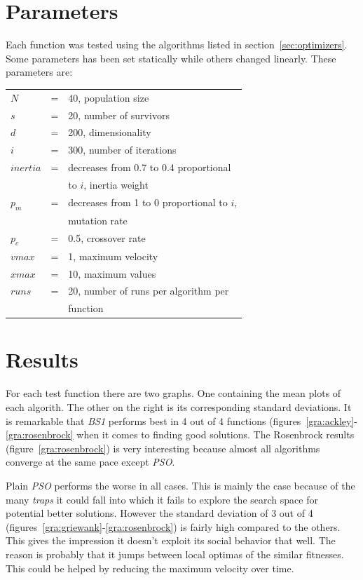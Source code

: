 \documentclass{acm_proc_article-sp}
\begin{document}
\section{Parameters}\label{sec:params}
Each function was tested using the algorithms listed in section~\ref{sec:optimizers}. Some parameters has been set statically while others changed linearly. These parameters are:\\

\begin{tabular}{lll}
$N$ & = & 40, population size\\
$s$ & = & 20, number of survivors\\
$d$ & = & 200, dimensionality\\
$i$ & = & 300, number of iterations\\
$inertia$ & = & decreases from 0.7 to 0.4 proportional\\
&& to $i$, inertia weight\\
$p_m$ & = & decreases from 1 to 0 proportional to $i$,\\
&& mutation rate\\
$p_c$ & = & 0.5, crossover rate\\
$vmax$ & = & 1, maximum velocity\\
$xmax$ & = & 10, maximum values\\
$runs$ & = & 20, number of runs per algorithm per \\
&& function\\
\end{tabular}

\section{Results}\label{sec:results}
For each test function there are two graphs. One containing the mean plots of each algorith. The other on the right is its corresponding standard deviations. It is remarkable that \emph{BS1} performs best in 4 out of 4 functions (figures~\ref{gra:ackley}-\ref{gra:rosenbrock} when it comes to finding good solutions. The Rosenbrock results (figure~\ref{gra:rosenbrock}) is very interesting because almost all algorithms converge at the same pace except \emph{PSO}.

Plain \emph{PSO} performs the worse in all cases. This is mainly the case because of the many \emph{traps} it could fall into which it fails to explore the search space for potential better solutions. However the standard deviation of 3 out of 4 (figures~\ref{gra:griewank}-\ref{gra:rosenbrock}) is fairly high compared to the others. This gives the impression it doesn't exploit its social behavior that well. The reason is probably that it jumps between local optimas of the similar fitnesses. This could be helped by reducing the maximum velocity over time.
\end{document}
